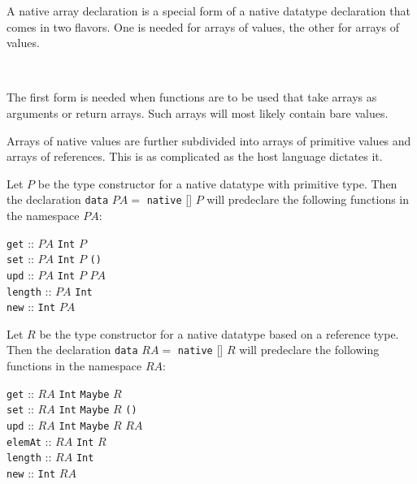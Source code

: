 A native array declaration is a special form of a native datatype declaration that comes in two flavors. One is needed for arrays of \java{} values, the other for arrays of \frege{} values.

\begin{flushleft}
   \sym{=}  \bracka\brackz{}  
  \alt {}   \sym{=}  \bracka\brackz{}  \\
\end{flushleft}

The first form is needed when \java{} functions are to be used that take arrays as arguments or return arrays. Such arrays will most likely contain bare \java{} values.

Arrays of native values are further subdivided into arrays of primitive values and arrays of references. This is as complicated as the host language dictates it.

Let $P$ be the type constructor for a native datatype with primitive \java{} type. Then the declaration \texttt{data} $PA =$ \texttt{native} [] $P$ will predeclare the following functions in the namespace $PA$:

\begin{flushleft}
\texttt{get} :: $PA$ \arrow{} \texttt{Int} \arrow{} $P$ \\
\texttt{set} :: $PA$ \arrow{} \texttt{Int} \arrow{} $P$ \arrow{} \texttt{()} \\
\texttt{upd} :: $PA$ \arrow{} \texttt{Int} \arrow{} $P$ \arrow{} $PA$ \\
\texttt{length} :: $PA$ \arrow{} \texttt{Int} \\
\texttt{new} :: \texttt{Int} \arrow{} $PA$ \\
\end{flushleft}

Let $R$ be the type constructor for a native datatype based on a \java{} reference type. Then the declaration \texttt{data} $RA =$ \texttt{native} [] $R$ will predeclare the following functions in the namespace $RA$:

\begin{flushleft}
\texttt{get} :: $RA$ \arrow{} \texttt{Int} \arrow{} \texttt{Maybe} $R$ \\
\texttt{set} :: $RA$ \arrow{} \texttt{Int} \arrow{} \texttt{Maybe} $R$ \arrow{} \texttt{()} \\
\texttt{upd} :: $RA$ \arrow{} \texttt{Int} \arrow{} \texttt{Maybe} $R$ \arrow{} $RA$ \\
\texttt{elemAt} :: $RA$ \arrow{} \texttt{Int} \arrow{} $R$ \\
\texttt{length} :: $RA$ \arrow{} \texttt{Int} \\
\texttt{new} :: \texttt{Int} \arrow{} $RA$ \\
\end{flushleft}

